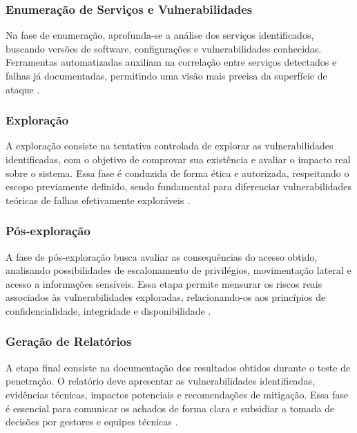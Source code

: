         \subsubsection*{Enumeração de Serviços e Vulnerabilidades}

        Na fase de enumeração, aprofunda-se a análise dos serviços identificados, buscando versões de software, configurações
         e vulnerabilidades conhecidas. Ferramentas automatizadas auxiliam na correlação entre serviços detectados e falhas já
          documentadas, permitindo uma visão mais precisa da superfície de ataque \citep{moreno2019introduccao}.

        \subsubsection*{Exploração}

        A exploração consiste na tentativa controlada de explorar as vulnerabilidades identificadas, com o objetivo de 
        comprovar sua existência e avaliar o impacto real sobre o sistema. Essa fase é conduzida de forma ética e autorizada,
         respeitando o escopo previamente definido, sendo fundamental para diferenciar vulnerabilidades teóricas de falhas 
         efetivamente exploráveis \citep{stallings2017network}.

        \subsubsection*{Pós-exploração}

        A fase de pós-exploração busca avaliar as consequências do acesso obtido, analisando possibilidades de escalonamento
        de privilégios, movimentação lateral e acesso a informações sensíveis. Essa etapa permite mensurar os riscos reais
        associados às vulnerabilidades exploradas, relacionando-os aos princípios de confidencialidade, integridade e disponibilidade \citep{moreno2019introduccao}.

        \subsubsection*{Geração de Relatórios}

        A etapa final consiste na documentação dos resultados obtidos durante o teste de penetração. O relatório deve apresentar
        as vulnerabilidades identificadas, evidências técnicas, impactos potenciais e recomendações de mitigação. Essa fase é
        essencial para comunicar os achados de forma clara e subsidiar a tomada de decisões por gestores e equipes técnicas \citep{moreno2019introduccao}.

